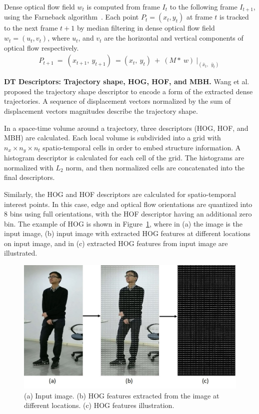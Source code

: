 Dense optical flow field $w_{t}$ is computed from frame $I_{t}$ to the following frame $I_{t+1}$, using the Farneback algorithm~\cite{farneback2003two}. Each point $P_{t} = (x_{t}, y_{t})$ at frame $t$ is tracked to the next frame $t+1$ by median filtering in dense optical flow field $w_{t} = (u_{t}, v_{t})$, where $u_{t}$, and $v_{t}$ are the horizontal and vertical components of optical flow respectively. 
\begin{equation}
\begin{aligned}
P_{t+1}\ =\ (x_{t+1},\ y_{t+1})\ =(x_{t},\ y_{t})\ +\ (M\ast\ w)\ |_{(\bar{x}_t,\ \ \bar{y}_t)}\ 
\end{aligned}
\end{equation}

\noindent
\textbf{DT Descriptors: Trajectory shape, HOG, HOF, and MBH. }
Wang et al.~\cite{wang2013action} proposed the trajectory shape descriptor to encode a form of the extracted dense trajectories. A sequence of displacement vectors normalized by the sum of displacement vectors magnitudes describe the trajectory shape.

In a space-time volume around a trajectory, three descriptors (HOG, HOF, and MBH) are calculated. Each local volume is subdivided into a grid with $ n_{x} \times n_{y} \times n_{t}$ spatio-temporal cells in order to embed structure information. A histogram descriptor is calculated for each cell of the grid. The histograms are normalized with $L_{2}$ norm, and then normalized cells are concatenated into the final descriptors. 

Similarly, the HOG and HOF descriptors are calculated for spatio-temporal interest points. In this case, edge and optical flow orientations are quantized into 8 bins using full orientations, with the HOF descriptor having an additional zero bin. The example of HOG is shown in Figure~\ref{fig:HOG-Example}, where in (a) the image is the input image, (b) input image with extracted HOG features at different locations on input image, and in (c) extracted HOG features from input image are illustrated.


\begin{figure}[!ht]
	\centering
	\includegraphics[width=.55\textheight]{figures/HOG-final2}
	\linebreak
	\caption{(a) Input image. (b) HOG features extracted from the image at different locations. (c) HOG features illustration.}
	\label{fig:HOG-Example}
\end{figure}

